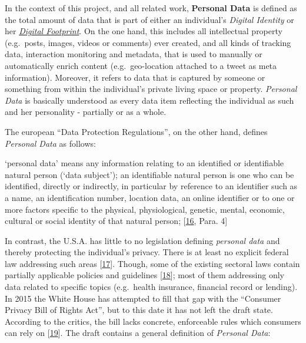 \documentclass[12pt,english,a4paper,titlepage,cleardoublepage=empty,dottedtoc]{report}
\let\origquote\quote
\let\endorigquote\endquote
\renewenvironment{quote}{%
    \origquote
    \itshape
}
{\endorigquote}
\begin{document}
In the context of this project, and all related work,
\textbf{\protect\hypertarget{def--personal-data}{}{Personal Data}} is
defined as the total amount of data that is part of either an
individual's \emph{Digital Identity} or her
\emph{\protect\hyperlink{terminologies--digital-footprint}{Digital
Footprint}}. On the one hand, this includes all intellectual property
(e.g.~posts, images, videos or comments) ever created, and all kinds of
tracking data, interaction monitoring and metadata, that is used to
manually or automatically enrich content (e.g.~geo-location attached to
a tweet as meta information). Moreover, it refers to data that is
captured by someone or something from within the individual's private
living space or property. \emph{Personal Data} is basically understood
as every data item reflecting the individual as such and her personality
- partially or as a whole.

The european ``Data Protection Regulations'', on the other hand, defines
\emph{\protect\hypertarget{def--personal-data-as-of-legis}{}{Personal
Data}} as follows:

\begin{quote}
`personal data' means any information relating to an identified or
identifiable natural person (`data subject'); an identifiable natural
person is one who can be identified, directly or indirectly, in
particular by reference to an identifier such as a name, an
identification number, location data, an online identifier or to one or
more factors specific to the physical, physiological, genetic, mental,
economic, cultural or social identity of that natural person;
{[}\protect\hyperlink{ref-regulation_2016_eu_general-data-protection-regulation_definition}{16},
Para. 4{]}
\end{quote}

In contrast, the U.S.A. has little to no legislation defining
\emph{personal data} and thereby protecting the individual's privacy.
There is at least no explicit federal law addressing such areas
{[}\protect\hyperlink{ref-web_2016_wikipedia_information-privacy-law_us}{17}{]}.
Though, some of the existing sectoral laws contain partially applicable
policies and guidelines
{[}\protect\hyperlink{ref-web_2016_data-protection-laws-in-the-us}{18}{]};
most of them addressing only data related to specific topics
(e.g.~health insurance, financial record or lending).\\
In 2015 the White House has attempted to fill that gap with the
``Consumer Privacy Bill of Rights Act'', but to this date it has not
left the draft state. According to the critics, the bill lacks concrete,
enforceable rules which consumers can rely on
{[}\protect\hyperlink{ref-web_2015_white-house-releases-consumer-privacy-bill-draft}{19}{]}.
The draft contains a general definition of \emph{Personal Data}:
\end{document}
